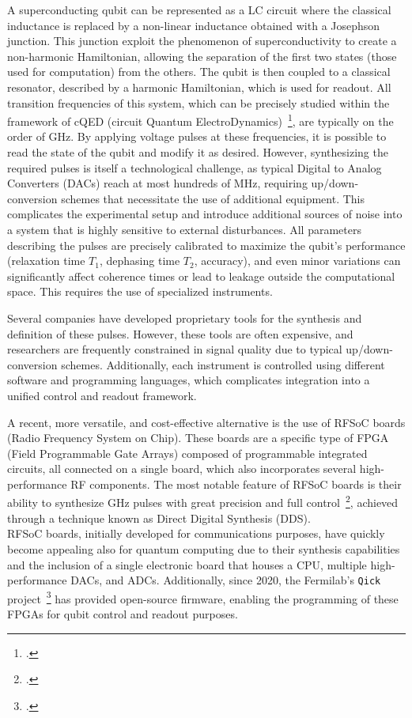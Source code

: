 \documentclass{article}
\newcommand{\Qick}{\texttt{Qick}\xspace}
\begin{document}
A superconducting qubit can be represented as a LC circuit where the classical inductance is replaced by a non-linear inductance obtained with a Josephson junction.
This junction exploit the phenomenon of superconductivity to create a non-harmonic Hamiltonian, allowing the separation of the first two states (those used for computation) from the others.
The qubit is then coupled to a classical resonator, described by a harmonic Hamiltonian, which is used for readout.
%
All transition frequencies of this system, which can be precisely studied within the framework of cQED (circuit Quantum ElectroDynamics)~\footcite{Blais2021}, are typically on the order of GHz.
%
By applying voltage pulses at these frequencies, it is possible to read the state of the qubit and modify it as desired.
%
However, synthesizing the required pulses is itself a technological challenge, as typical Digital to Analog Converters (DACs) reach at most hundreds of MHz, requiring up/down-conversion schemes that necessitate the use of additional equipment.
This complicates the experimental setup and introduce additional sources of noise into a system that is highly sensitive to external disturbances.
%
All parameters describing the pulses are precisely calibrated to maximize the qubit's performance (relaxation time $T_1$, dephasing time $T_2$, accuracy), and even minor variations can significantly affect coherence times or lead to leakage outside the computational space.
This requires the use of specialized instruments.

Several companies have developed proprietary tools for the synthesis and definition of these pulses.
However, these tools are often expensive, and researchers are frequently constrained in signal quality due to typical up/down-conversion schemes.
Additionally, each instrument is controlled using different software and programming languages, which complicates integration into a unified control and readout framework.

A recent, more versatile, and cost-effective alternative is the use of RFSoC boards (Radio Frequency System on Chip).
These boards are a specific type of FPGA (Field Programmable Gate Arrays) composed of programmable integrated circuits, all connected on a single board, which also incorporates several high-performance RF components.
The most notable feature of RFSoC boards is their ability to synthesize GHz pulses with great precision and full control~\footcite{Kalfus2020}, achieved through a technique known as Direct Digital Synthesis (DDS).\\
%
RFSoC boards, initially developed for communications purposes, have quickly become appealing also for quantum computing due to their synthesis capabilities and the inclusion of a single electronic board that houses a CPU, multiple high-performance DACs, and ADCs.
Additionally, since 2020, the Fermilab's \Qick project~\footcite{Stefanazzi2022} has provided open-source firmware, enabling the programming of these FPGAs for qubit control and readout purposes.
\end{document}
